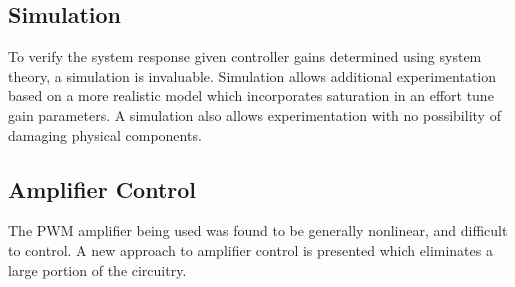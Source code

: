 \subsection{Simulation} 

To verify the system response given controller gains determined using system theory, a simulation is invaluable.
Simulation allows additional experimentation based on a more realistic model which incorporates saturation in an effort tune gain parameters. 
A simulation also allows experimentation with no possibility of damaging physical components. %

\subsection{Amplifier Control} 

The PWM amplifier being used was found to be generally nonlinear, and difficult to control.
A new approach to amplifier control is presented which eliminates a large portion of the circuitry. 

